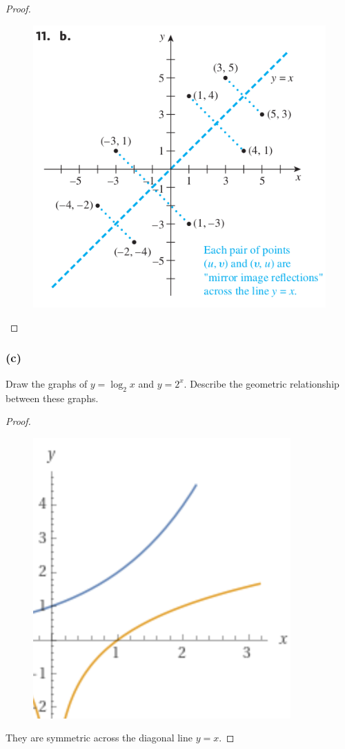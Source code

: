 \documentclass[14pt]{extarticle}
\begin{document}
\begin{proof}
    \begin{figure}[ht!]
        \centering
        \includegraphics[scale=0.5]{../images/11.4.11.b.png}
    \end{figure}
\end{proof}

\subsubsection{(c)}
Draw the graphs of \(y = \log_2 x\) and \(y = 2^x\). Describe the geometric relationship between these graphs.

\begin{proof}
    \begin{figure}[ht!]
        \centering
        \includegraphics[scale=0.5]{../images/11.4.11.c.png}
    \end{figure}

    They are symmetric across the diagonal line \(y = x\).
\end{proof}
\end{document}
